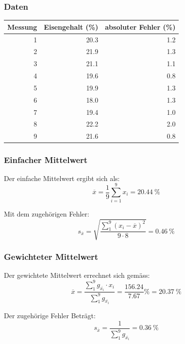 \subsubsection{Daten}
\begin{center}
\begin{tabular}{rrr}
    \toprule
    Messung & Eisengehalt (\%) & absoluter Fehler (\%) \\
    \midrule
    1 & 20.3 & 1.2 \\
    2 & 21.9 & 1.3 \\
    3 & 21.1 & 1.1 \\
    4 & 19.6 & 0.8 \\
    5 & 19.9 & 1.3 \\
    6 & 18.0 & 1.3 \\
    7 & 19.4 & 1.0 \\
    8 & 22.2 & 2.0 \\
    9 & 21.6 & 0.8 \\
    \bottomrule
\end{tabular}
\end{center}

\subsubsection{Einfacher Mittelwert}

Der einfache Mittelwert ergibt sich als:
\begin{equation}
    \overline{x} = \frac{1}{9}\sum_{i=1}^9 x_i = \SI{20.44}{\percent}
\end{equation}

Mit dem zugeh\"origen Fehler:
\begin{equation}
    s_{\overline{x}} = \sqrt{\frac{\sum_1^9(x_i-\overline{x})^2}{9 \cdot 8}} = \SI{0.46}{\percent}
\end{equation}


\subsubsection{Gewichteter Mittelwert}

Der gewichtete Mittelwert errechnet sich gem\"ass:
\begin{equation}
    \overline{x} = \frac{\sum_1^9 g_{\overline{x_i}} \cdot x_i}{\sum_1^9 g_{\overline{x_i}}} = \frac{156.24}{7.67} \si{\percent} = \SI{20.37}{\percent}
\end{equation}

Der zugeh\"orige Fehler Betr\"agt:
\begin{equation}
    s_{\overline{x}} = \frac{1}{\sum_1^9 g_{\overline{x_i}}} = \SI{0.36}{\percent}
\end{equation}

